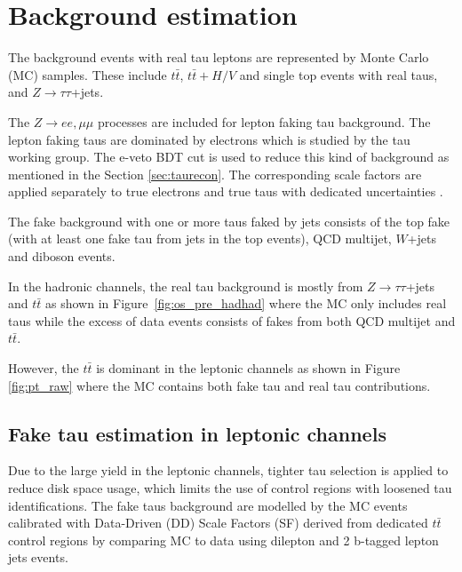 \section{Background estimation}
\label{sec:background}

%

The background events with real tau leptons are represented by Monte Carlo (MC) samples. These include $t\bar{t}$, $t\bar{t}+H/V$ and 
single top events with real taus, and $Z\to\tau\tau$+jets.

The $Z\to ee,\mu\mu$ processes are included for lepton faking tau background. The lepton faking taus are dominated by electrons which is studied by the tau working group. The e-veto BDT cut is used to reduce this kind of background as mentioned in the Section \ref{sec:taurecon}. The corresponding scale factors are applied separately to true electrons and true taus with dedicated uncertainties \cite{TauCP}. 

%

The fake background with one or more taus faked by jets consists of the top fake (with at least one fake tau from jets in the top events), QCD multijet, $W$+jets and diboson events.

In the hadronic channels, the real tau background is mostly from $Z\to\tau\tau$+jets and $t\bar t$  as shown in Figure~\ref{fig:os_pre_hadhad} where the MC only includes real taus while the excess of data events consists of fakes from both QCD multijet and $t\bar t$.

However, the $t\bar t$ is dominant in the leptonic channels as shown in Figure \ref{fig:pt_raw} where the MC contains both fake tau and real tau contributions.





\subsection{Fake tau estimation in leptonic channels}
\label{sec:sf_method}

Due to the large yield in the leptonic channels, tighter tau selection is applied to reduce disk space usage, which limits the use of control regions with loosened tau identifications. The fake taus background are modelled by the MC events calibrated with Data-Driven (DD) Scale Factors (SF) derived from dedicated $t\bar t$ control regions by comparing MC to data using dilepton and 2 b-tagged lepton jets events.


